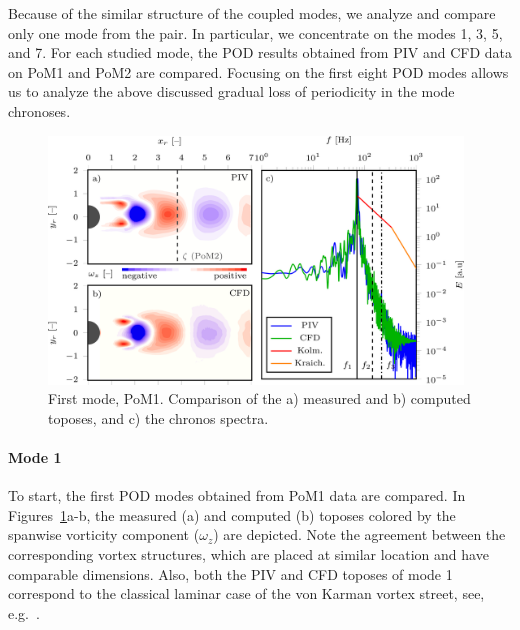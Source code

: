 Because of the similar structure of the {coupled} modes, we analyze and compare only one mode from the pair. In particular, we concentrate on the modes 1, 3{, 5,} and 7. For each studied mode, the POD results obtained from PIV and CFD data on PoM1 and PoM2 are compared. {Focusing on the first eight POD modes allows us to analyze the above discussed gradual loss of periodicity in the mode chronoses.} 
\begin{figure}[htpb]
    \centering
    \includegraphics[width=0.98\textwidth]{02_images/00_export/figure11.png}
    \caption{{First mode, PoM1.} Comparison of the a) measured and b) computed toposes, and c) the chronos spectra.}
    \label{fig:pom1mod1}
\end{figure}


\paragraph{Mode 1}
To start, the first {POD} mode{s} obtained from PoM1 data are compared. {In Figures~\ref{fig:pom1mod1}a-b, the measured (a) and computed (b) toposes colored by the } {spanwise} vorticity component {($\omega_z$)} are depicted. {Note the agreement between the corresponding vortex structures, which are placed at similar location and have comparable dimensions. Also, both the PIV and CFD toposes of mode 1 correspond} to the classical laminar case of the von Karman vortex street, {see, e.g.}~\cite{taira2020}. 

